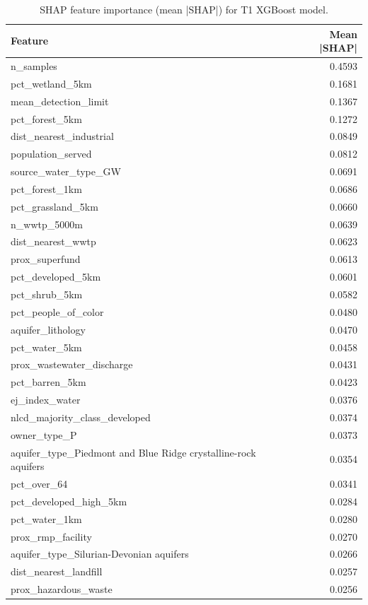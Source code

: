 \begin{table}
\caption{SHAP feature importance (mean |SHAP|) for T1 XGBoost model.}
\label{tab:shap-importance}
\begin{tabular}{lr}
\toprule
Feature & Mean |SHAP| \\
\midrule
n\_samples & 0.4593 \\
pct\_wetland\_5km & 0.1681 \\
mean\_detection\_limit & 0.1367 \\
pct\_forest\_5km & 0.1272 \\
dist\_nearest\_industrial & 0.0849 \\
population\_served & 0.0812 \\
source\_water\_type\_GW & 0.0691 \\
pct\_forest\_1km & 0.0686 \\
pct\_grassland\_5km & 0.0660 \\
n\_wwtp\_5000m & 0.0639 \\
dist\_nearest\_wwtp & 0.0623 \\
prox\_superfund & 0.0613 \\
pct\_developed\_5km & 0.0601 \\
pct\_shrub\_5km & 0.0582 \\
pct\_people\_of\_color & 0.0480 \\
aquifer\_lithology & 0.0470 \\
pct\_water\_5km & 0.0458 \\
prox\_wastewater\_discharge & 0.0431 \\
pct\_barren\_5km & 0.0423 \\
ej\_index\_water & 0.0376 \\
nlcd\_majority\_class\_developed & 0.0374 \\
owner\_type\_P & 0.0373 \\
aquifer\_type\_Piedmont and Blue Ridge crystalline-rock aquifers & 0.0354 \\
pct\_over\_64 & 0.0341 \\
pct\_developed\_high\_5km & 0.0284 \\
pct\_water\_1km & 0.0280 \\
prox\_rmp\_facility & 0.0270 \\
aquifer\_type\_Silurian-Devonian aquifers & 0.0266 \\
dist\_nearest\_landfill & 0.0257 \\
prox\_hazardous\_waste & 0.0256 \\
\bottomrule
\end{tabular}
\end{table}
